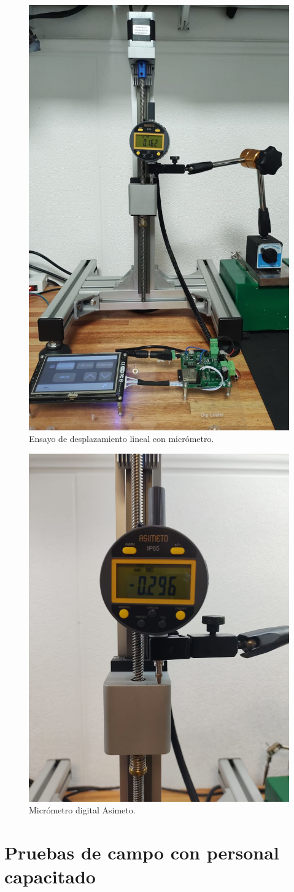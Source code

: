 \begin{figure}[!ht]
	\centering
	\includegraphics[width=.5\textwidth]{./Figures/desplazamiento_lineal.png}
	\caption{Ensayo de desplazamiento lineal con micrómetro.}
	\label{fig:desplazamiento_lineal}
\end{figure}

\begin{figure}[!ht]
	\centering
	\includegraphics[width=.5\textwidth]{./Figures/micrometro.png}
	\caption{Micrómetro digital Asimeto.}
	\label{fig:micrometro}
\end{figure}


\section{Pruebas de campo con personal capacitado}